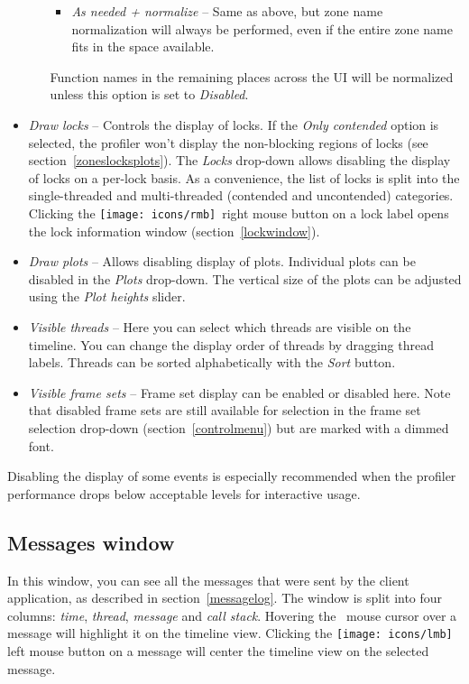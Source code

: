 \documentclass[hidelinks,titlepage,a4paper,twoside]{article}
\newcommand{\LMB}{\texttt{[image: icons/lmb]}}
\newcommand{\RMB}{\texttt{[image: icons/rmb]}}
\begin{document}
\begin{itemize}
\begin{itemize}
\begin{itemize}
\item \emph{As needed + normalize} -- Same as above, but zone name normalization will always be performed, even if the entire zone name fits in the space available.
\end{itemize}
Function names in the remaining places across the UI will be normalized unless this option is set to \emph{Disabled}.
\end{itemize}
\item \emph{\faLock{} Draw locks} -- Controls the display of locks. If the \emph{Only contended} option is selected, the profiler won't display the non-blocking regions of locks (see section~\ref{zoneslocksplots}). The \emph{Locks} drop-down allows disabling the display of locks on a per-lock basis. As a convenience, the list of locks is split into the single-threaded and multi-threaded (contended and uncontended) categories. Clicking the \RMB{}~right mouse button on a lock label opens the lock information window (section~\ref{lockwindow}).
\item \emph{\faSignature{} Draw plots} -- Allows disabling display of plots. Individual plots can be disabled in the \emph{Plots} drop-down. The vertical size of the plots can be adjusted using the \emph{Plot heights} slider.
\item \emph{\faRandom{} Visible threads} -- Here you can select which threads are visible on the timeline. You can change the display order of threads by dragging thread labels. Threads can be sorted alphabetically with the \emph{Sort} button.
\item \emph{\faImages{} Visible frame sets} -- Frame set display can be enabled or disabled here. Note that disabled frame sets are still available for selection in the frame set selection drop-down (section~\ref{controlmenu}) but are marked with a dimmed font.
\end{itemize}

Disabling the display of some events is especially recommended when the profiler performance drops below acceptable levels for interactive usage.

\subsection{Messages window}
\label{messages}

In this window, you can see all the messages that were sent by the client application, as described in section~\ref{messagelog}. The window is split into four columns: \emph{time}, \emph{thread}, \emph{message} and \emph{call stack}. Hovering the \faMousePointer{}~mouse cursor over a message will highlight it on the timeline view. Clicking the \LMB{} left mouse button on a message will center the timeline view on the selected message.
\end{document}
